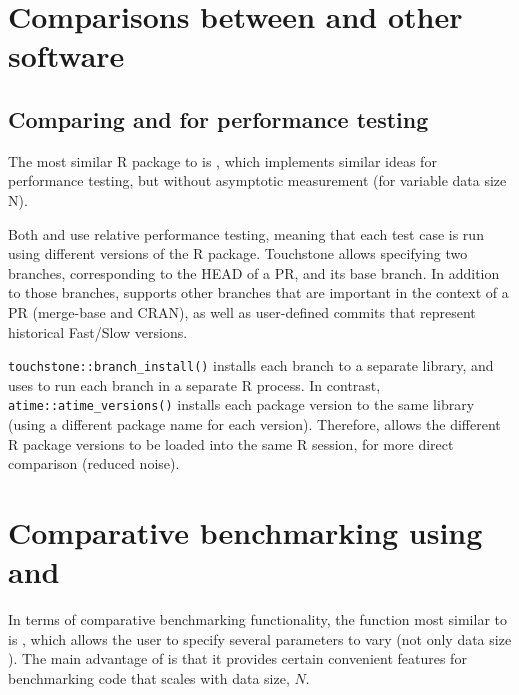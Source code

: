 \section{Comparisons between  and other software}

\subsection{Comparing  and   for performance testing}

The most similar R package to  is , which implements similar ideas for performance testing, but without asymptotic measurement (for variable data size N). 


Both  and  use relative performance testing, meaning that each test case is run using different versions of the R package.
Touchstone allows specifying two branches, corresponding to the HEAD of a PR, and its base branch.
In addition to those branches,  supports other branches that are important in the context of a PR (merge-base and CRAN), as well as user-defined commits that represent historical Fast/Slow versions.

\verb|touchstone::branch_install()| installs each branch to a separate library, and uses  to run each branch in a separate R process.
In contrast, \verb|atime::atime_versions()| installs each package version to the same library (using a different package name for each version).
Therefore,  allows the different R package versions to be loaded into the same R session, for more direct comparison (reduced noise).

\section{Comparative benchmarking using  and }


In terms of comparative benchmarking functionality, the function most similar to  is , which allows the user to specify several parameters to vary (not only data size ).
The main advantage of  is that it provides certain convenient features for benchmarking code that scales with data size, $N$. 


